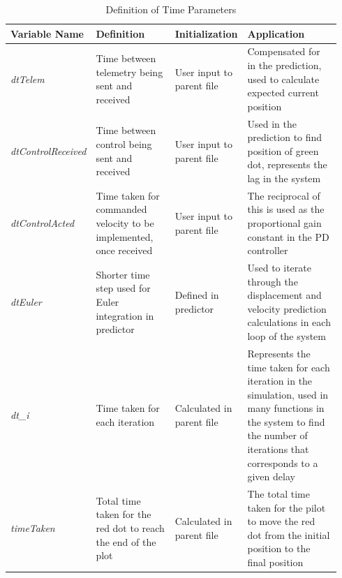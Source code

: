 \documentclass{article}
\begin{document}
\begin{table}[H]
	\centering
	\raggedright
	\begin{tabular}{ | p{0.17\linewidth} |
			p{0.275\linewidth} |
			p{0.15\linewidth} |
			p{0.35\linewidth} | } 
		\hline
		\textbf{Variable Name} & \textbf{Definition} & \textbf{Initialization}   & \textbf{Application}    \\ \hline
		\textit{dtTelem}                & Time between telemetry being sent and received                     & User input to parent file & Compensated for in the prediction, used to calculate expected current position                                                                                              \\ \hline
		\textit{dtControlReceived}      & Time between control being sent and received                       & User input to parent file & Used in the prediction to find position of green dot, represents the lag in the system                                                                                      \\ \hline
		\textit{dtControlActed}         & Time taken for commanded velocity to be implemented, once received & User input to parent file & The reciprocal of this is used as the proportional gain constant in the PD controller                                                                                   \\ \hline
		\textit{dtEuler}                & Shorter time step used for Euler integration in predictor          & Defined in predictor      & Used to iterate through the displacement and velocity prediction calculations in each loop of the system                                                                \\ \hline
		\textit{dt\_i}                  & Time taken for each iteration                                      & Calculated in parent file & Represents the time taken for each iteration in the simulation, used in many functions in the system to find the number of iterations that corresponds to a given delay \\ \hline
		\textit{timeTaken}              & Total time taken for the red dot to reach the end of the plot      & Calculated in parent file & The total time taken for the pilot to move the red dot from the initial position to the final position                                                                  \\ \hline
	\end{tabular}
	\caption{Definition of Time Parameters}
	\label{Table}
\end{table}
\end{document}
